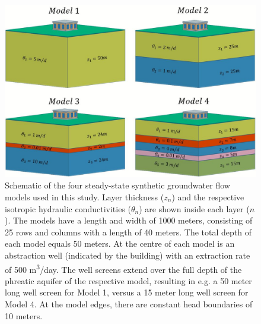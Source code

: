 \begin{figure}[ht]
\centering
\includegraphics[width=1.0\linewidth]{Figures/CONGROMO_NEW4.JPG}
\caption{Schematic of the four steady-state synthetic groundwater flow models used in this study. Layer thickness ($z_n$) and the respective isotropic hydraulic conductivities ($\theta_n$) are shown inside each layer ($n$). The models have a length and width of 1000 meters, consisting of 25 rows and columns with a length of 40 meters. The total depth of each model equals 50 meters. At the centre of each model is an abstraction well (indicated by the building) with an extraction rate of 500 m\textsuperscript{3}/day. The well screens extend over the full depth of the phreatic aquifer of the respective model, resulting in e.g. a 50 meter long well screen for Model 1, versus a 15 meter long well screen for Model 4. At the model edges, there are constant head boundaries of 10 meters.}\label{fig_sgm} %
\end{figure} %

